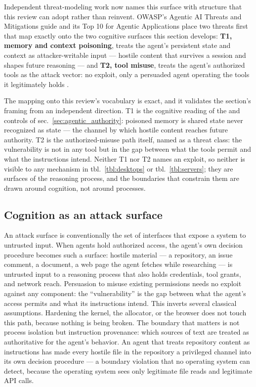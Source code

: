 \documentclass[
  english,
  9pt,
]{extarticle}
\begin{document}
Independent threat-modeling work now names this surface with structure
that this review can adopt rather than reinvent. OWASP's Agentic AI
Threats and Mitigations guide and its Top 10 for Agentic Applications
place two threats first that map exactly onto the two cognitive surfaces
this section develops: \textbf{T1, memory and context poisoning}, treats
the agent's persistent state and context as attacker-writable input ---
hostile content that survives a session and shapes future reasoning ---
and \textbf{T2, tool misuse}, treats the agent's authorized tools as the
attack vector: no exploit, only a persuaded agent operating the tools it
legitimately holds \citep{owasp_agentic_top10, owasp_agentic_tm}.

The mapping onto this review's vocabulary is exact, and it validates the
section's framing from an independent direction. T1 is the cognitive
reading of the  and
 controls of
sec.~\ref{sec:agentic_authority}: poisoned memory is shared state never
recognized as state --- the channel by which hostile content reaches
future authority. T2 is the authorized-misuse path itself, named as a
threat class: the vulnerability is not in any tool but in the gap
between what the tools permit and what the instructions intend. Neither
T1 nor T2 names an exploit, so neither is visible to any mechanism in
tbl.~\ref{tbl:desktops} or tbl.~\ref{tbl:servers}; they are surfaces of
the reasoning process, and the boundaries that constrain them are drawn
around cognition, not around processes.

\subsection{Cognition as an attack
surface}\label{cognition-as-an-attack-surface}

An attack surface is conventionally the set of interfaces that expose a
system to untrusted input. When agents hold authorized access, the
agent's own decision procedure becomes such a surface: hostile material
--- a repository, an issue comment, a document, a web page the agent
fetches while researching --- is untrusted input to a reasoning process
that also holds credentials, tool grants, and network reach. Persuasion
to misuse existing permissions needs no exploit against any component:
the ``vulnerability'' is the gap between what the agent's access permits
and what its instructions intend. This inverts several classical
assumptions. Hardening the kernel, the allocator, or the browser does
not touch this path, because nothing is being broken. The boundary that
matters is not process isolation but instruction provenance: which
sources of text are treated as authoritative for the agent's behavior.
An agent that treats repository content as instructions has made every
hostile file in the repository a privileged channel into its own
decision procedure --- a boundary violation that no operating system can
detect, because the operating system sees only legitimate file reads and
legitimate API calls.
\end{document}
